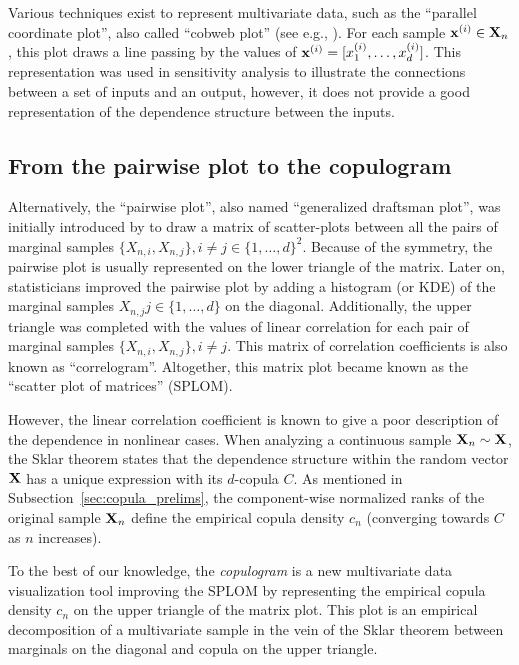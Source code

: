 Various techniques exist to represent multivariate data, such as the ``parallel coordinate plot'', also called ``cobweb plot'' (see e.g., \citealp{heinrich_2013_cobweb}). 
For each sample ${\bf x}^{(i)} \in {\bf X}_n$, this plot draws a line passing by the values of ${\bf x}^{(i)} = [x_1^{(i)}, \dots, x_d^{(i)}]$. 
This representation was used in sensitivity analysis to illustrate the connections between a set of inputs and an output, however, it does not provide a good representation of the dependence structure between the inputs. 

\subsection{From the pairwise plot to the copulogram}
Alternatively, the ``pairwise plot'', also named ``generalized draftsman plot'', was initially introduced by \citet{hartigan_1975_splom} to draw a matrix of scatter-plots between all the pairs of marginal samples $\{X_{n, i}, X_{n, j}\}, i \ne j \in \{1, \dots, d\}^2$. 
Because of the symmetry, the pairwise plot is usually represented on the lower triangle of the matrix. 
Later on, statisticians improved the pairwise plot by adding a histogram (or KDE) of the marginal samples $X_{n, j} j \in \{1, \dots, d\}$ on the diagonal. 
Additionally, the upper triangle was completed with the values of linear correlation for each pair of marginal samples $\{X_{n, i}, X_{n, j}\}, i \ne j$. 
This matrix of correlation coefficients is also known as ``correlogram''. 
Altogether, this matrix plot became known as the ``scatter plot of matrices'' (SPLOM). 

However, the linear correlation coefficient is known to give a poor description of the dependence in nonlinear cases. 
When analyzing a continuous sample ${\bf X}_n \sim {\bf X}$, the Sklar theorem states that the dependence structure within the random vector ${\bf X}$ has a unique expression with its $d$-copula $C$. 
As mentioned in Subsection~\ref{sec:copula_prelims}, the component-wise normalized ranks of the original sample ${\bf X}_n$ define the empirical copula density $c_n$ (converging towards $C$ as $n$ increases).

To the best of our knowledge, the \textit{copulogram} is a new multivariate data visualization tool improving the SPLOM by representing the empirical copula density $c_n$ on the upper triangle of the matrix plot. 
This plot is an empirical decomposition of a multivariate sample in the vein of the Sklar theorem between marginals on the diagonal and copula on the upper triangle.

